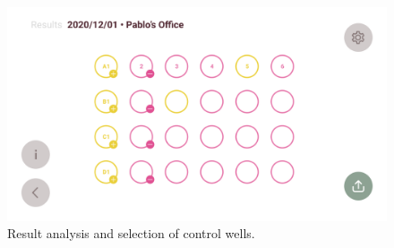 \begin{figure}[h]
    \centering
    \includegraphics[width=\linewidth]{mnt/fig/lamp-reader-app-results}
    \caption{Result analysis and selection of control wells.}
    \label{fig:my_label}
\end{figure}
